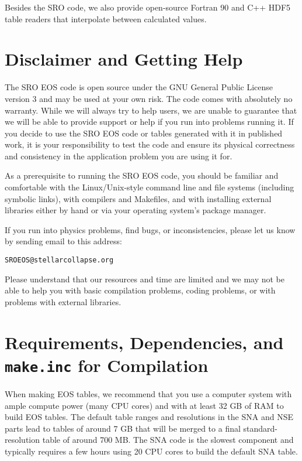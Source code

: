 \documentclass[letterpaper,11pt]{refart}
\newcommand{\SRO}{SRO }
\begin{document}
Besides the \SRO code, we also provide open-source Fortran 90 and C++
HDF5 table readers that interpolate between calculated values.

\section{Disclaimer and Getting Help}

\begin{framed}
The SRO EOS code is open source under the GNU General Public License
version 3 and may be used at your own risk. The code comes with
absolutely no warranty. While we will always try to help users, we are
unable to guarantee that we will be able to provide support or help if
you run into problems running it. If you decide to use the SRO EOS
code or tables generated with it in published work, it is your
responsibility to test the code and ensure its physical correctness
and consistency in the application problem you are using it for.
\end{framed}

As a prerequisite to running the SRO EOS code, you should be familiar
and comfortable with the Linux/Unix-style command line and file
systems (including symbolic links), with compilers and Makefiles, and
with installing external libraries either by hand or via your
operating system's package manager.

If you run into physics problems, find bugs, or inconsistencies, please
let us know by sending email to this address:

\begin{center}
\texttt{SROEOS@stellarcollapse.org} 
\end{center}

Please understand that our resources and time are limited and we may
not be able to help you with basic compilation problems, coding
problems, or with problems with external libraries.

\section{Requirements, Dependencies, and \texttt{make.inc} for Compilation}
\label{sec:req}

When making EOS tables, we recommend that you use a computer system
with ample compute power (many CPU cores) and with at least 32 GB of
RAM to build EOS tables. The default table ranges and resolutions in the
SNA and NSE parts lead to tables of around 7 GB that will be merged
to a final standard-resolution table of around 700 MB. The SNA code
is the slowest component and typically requires a few hours using 20 CPU
cores to build the default SNA table.
\end{document}
